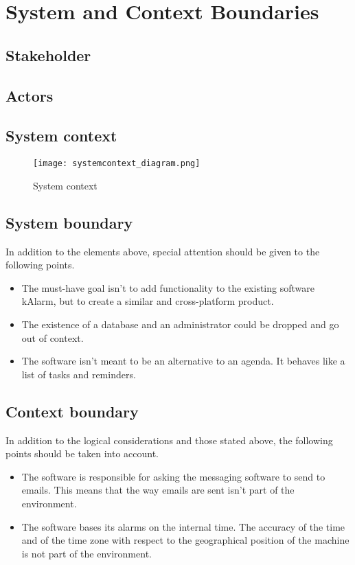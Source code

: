\chapter{System and Context Boundaries}\label{ch:sys_ctx_boundaries}

\section{Stakeholder}


\section{Actors}


\newpage
\section{System context}
\begin{figure}[h]
	\centering
	\caption{System context}
	\texttt{[image: systemcontext\_diagram.png]}
\end{figure}

\section{System boundary}
In addition to the elements above, special attention should be given to the following points.
\begin{itemize}
	\item The must-have goal isn't to add functionality to the existing software kAlarm, but to create a similar and cross-platform product.
	\item The existence of a database and an administrator could be dropped and go out of context.
	\item The software isn't meant to be an alternative to an agenda. It behaves like a list of tasks and reminders.
\end{itemize}

\section{Context boundary}
In addition to the logical considerations and those stated above, the following points should be taken into account.
\begin{itemize}
	\item The software is responsible for asking the messaging software to send to emails. This means that the way emails are sent isn't part of the environment.
	\item The software bases its alarms on the internal time. The accuracy of the time and of the time zone with respect to the geographical position of the machine is not part of the environment.
\end{itemize}
